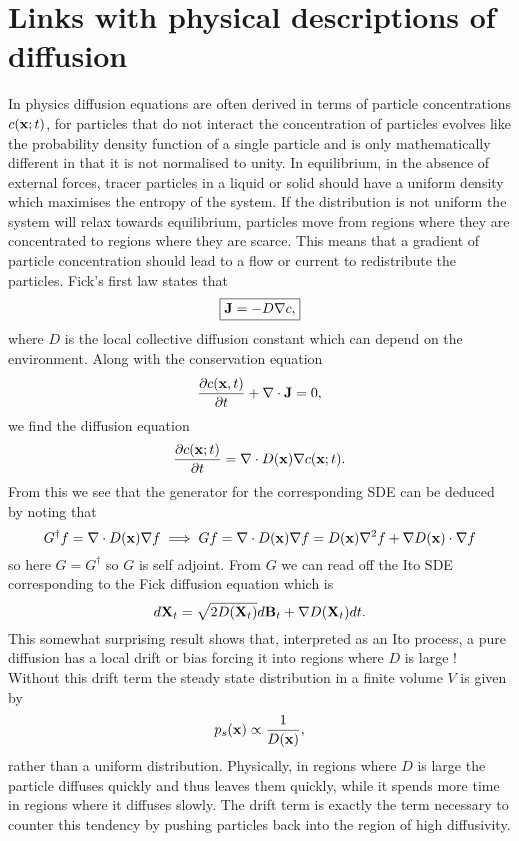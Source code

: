 \documentclass[11pt]{report}
\begin{document}
\section{Links with physical descriptions of diffusion}
In physics diffusion equations are often derived in terms of particle concentrations $c({\bf x};t)$, for particles that do not interact the concentration of particles evolves like the probability density function of a single particle and is only mathematically different in that  it is not normalised to unity. In equilibrium, in the absence of external forces, tracer particles in a liquid or solid should have a uniform density which maximises the entropy of the system. 
If the distribution is not uniform the system will relax towards equilibrium, particles move from regions where they are concentrated to regions where they are scarce. This means that a gradient of particle concentration should lead to a flow or current to redistribute the particles. Fick's first law states that
\begin{equation}
\boxed{
{\bf J} = -D \nabla c,}
\end{equation}
where $D$ is the local collective diffusion constant which can depend on the environment.
Along with the conservation equation 
\begin{equation}
{\partial c({\bf x},t)\over \partial t} + \nabla \cdot {\bf J} =0, 
\end{equation}
we find the diffusion equation
\begin{equation}
{\partial c({\bf x};t)\over \partial t} =\nabla\cdot D({\bf x})\nabla c({\bf x};t).
\end{equation}
From this we see that the generator for the corresponding SDE can be deduced by
noting that
\begin{equation}
G^\dagger f =  \nabla\cdot D({\bf x})\nabla f \implies G f =  \nabla\cdot D({\bf x})\nabla f = D({\bf x})\nabla^2 f + \nabla D({\bf x})\cdot\nabla f
\end{equation}
so here $G=G^\dagger$ so $G$ is self adjoint. From $G$ we can read off the Ito SDE corresponding to the Fick diffusion equation which is
\begin{equation}
 d{\bf X}_t = \sqrt{2 D({\bf X}_t)} d{\bf B}_t + \nabla D({\bf X}_t) dt.\label{sdedif}
\end{equation}
This somewhat surprising result shows that, interpreted as an Ito process, a pure diffusion has a local drift or bias forcing it into regions where $D$ is large ! Without this drift term
the steady state distribution in a finite volume $V$ is given by
\begin{equation}
p_{s}({\bf x}) \propto \frac{1}{D({\bf x})},
\end{equation}
rather than a uniform distribution. Physically, in regions where $D$ is large the particle diffuses quickly and thus leaves them quickly, while it spends more time in regions where it diffuses slowly. The drift term is exactly the term necessary to counter this tendency by pushing particles back into the region of high diffusivity.  
\end{document}
